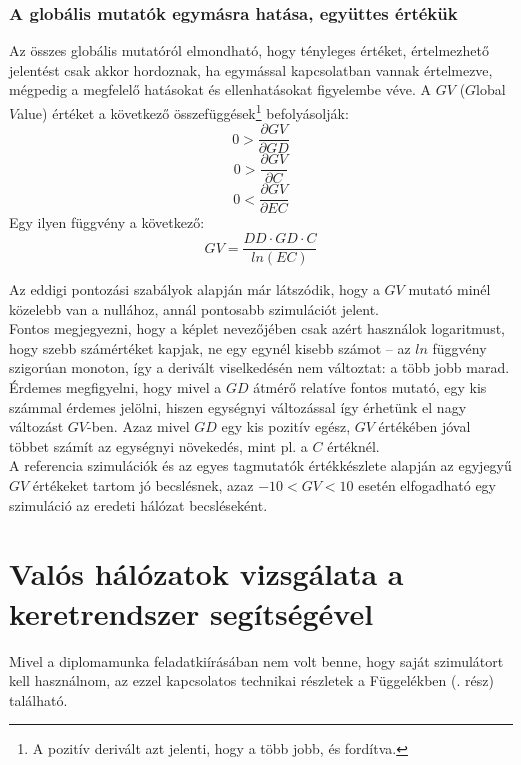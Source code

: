     \subsubsection{A globális mutatók egymásra hatása, együttes értékük}
    Az összes globális mutatóról elmondható, hogy tényleges értéket, értelmezhető jelentést csak akkor hordoznak, ha egymással kapcsolatban vannak értelmezve, mégpedig a megfelelő hatásokat és ellenhatásokat figyelembe véve. A $GV$ ($G$lobal$V$alue) értéket a következő összefüggések\footnote{A pozitív derivált azt jelenti, hogy a több jobb, és fordítva.} befolyásolják:
    $$0 > \frac{\partial GV}{\partial GD}$$
    $$0 > \frac{\partial GV}{\partial C}$$
    $$0 < \frac{\partial GV}{\partial EC}$$
    Egy ilyen függvény a következő:
    $$GV = \frac{DD \cdot GD \cdot C}{ln(EC)}$$

    Az eddigi pontozási szabályok alapján már látszódik, hogy a $GV$ mutató minél közelebb van a nullához, annál pontosabb szimulációt jelent.\\
    Fontos megjegyezni, hogy a képlet nevezőjében csak azért használok logaritmust, hogy szebb számértéket kapjak, ne egy egynél kisebb számot -- az $ln$ függvény szigorúan monoton, így a derivált viselkedésén nem változtat: a több jobb marad. Érdemes megfigyelni, hogy mivel a $GD$ átmérő relatíve fontos mutató, egy kis számmal érdemes jelölni, hiszen egységnyi változással így érhetünk el nagy változást $GV$-ben. Azaz mivel $GD$ egy kis pozitív egész, $GV$ értékében jóval többet számít az egységnyi növekedés, mint pl. a $C$ értéknél.\\

    A referencia szimulációk és az egyes tagmutatók értékkészlete alapján az egyjegyű $GV$ értékeket tartom jó becslésnek, azaz $-10 < GV < 10$ esetén elfogadható egy szimuláció az eredeti hálózat becsléseként.

  \section{Valós hálózatok vizsgálata a keretrendszer segítségével}\label{section_real}
  Mivel a diplomamunka feladatkiírásában nem volt benne, hogy saját szimulátort kell használnom, az ezzel kapcsolatos technikai részletek a Függelékben (. rész) található.\\

